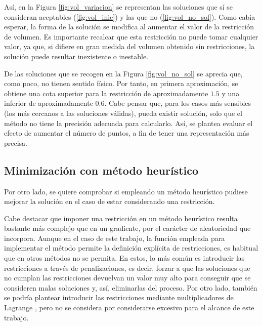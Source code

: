 Así, en la Figura \ref{fig:vol_variacion} se representan las soluciones que sí se consideran aceptables (\ref{fig:vol_inic}) y las que no (\ref{fig:vol_no_sol}). Como cabía esperar, la forma de la solución se modifica al aumentar el valor de la restricción de volumen. Es importante recalcar que esta restricción no puede tomar cualquier valor, ya que, si difiere en gran medida del volumen obtenido sin restricciones, la solución puede resultar inexistente o inestable. 

De las soluciones que se recogen en la Figura \ref{fig:vol_no_sol} se aprecia que, como poco, no tienen sentido físico. Por tanto, en primera aproximación, se obtiene una cota superior para la restricción de aproximadamente $1.5$ y una inferior de aproximadamente $0.6$. Cabe pensar que, para los casos más sensibles (los más cercanos a las soluciones válidas), pueda existir solución, solo que el método no tiene la precisión adecuada para calcularlo. Así, se plantea evaluar el efecto de aumentar el número de puntos, a fin de tener una representación más precisa.%



\subsection{Minimización con método heurístico}

Por otro lado, se quiere comprobar si empleando un método heurístico pudiese mejorar la solución en el caso de estar considerando una restricción.

Cabe destacar que imponer una restricción en un método heurístico resulta bastante más complejo que en un gradiente, por el carácter de aleatoriedad que incorpora. Aunque en el caso de este trabajo, la función empleada para implementar el método permite la definición explícita de restricciones, es habitual que en otros métodos no se permita. En estos, lo más común es introducir las restricciones a través de penalizaciones, es decir, forzar a que las soluciones que no cumplan las restricciones devuelvan un valor muy alto para conseguir que se consideren malas soluciones y, así, eliminarlas del proceso. Por otro lado, también se podría plantear introducir las restricciones mediante multiplicadores de Lagrange \cite{deb2012genetic}, pero no se considera por considerarse excesivo para el alcance de este trabajo.

